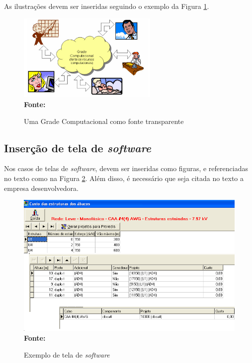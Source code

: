 As ilustrações devem ser inseridas seguindo o exemplo da Figura \ref{fig:figura1}. 
\begin{figure}[ht]
	\centering	
	\caption[\hspace{0.1cm}Grade Computacional.]{Uma Grade Computacional como fonte transparente}
	\vspace{-0.4cm}
	\includegraphics[width=0.6\textwidth]{figuras/grade-comp.png}
	 \vspace{-0.2cm}
	\\\textbf{\footnotesize Fonte: \cite{cap-livro} }
	\label{fig:figura1}
\end{figure}
\vspace{-0.5cm}

\subsection{\esp Inserção de tela de \textit{software}}

Nos casos de telas de \textit{\textit{software}}, devem ser inseridas como figuras, e referenciadas no texto
como na Figura \ref{fig:tela1}. Além disso, é necessário que seja citada no texto a empresa desenvolvedora.

\begin{figure}[!ht]
	\centering	
	\caption[\hspace{0.1cm}Exemplo de tela de \textit{software}.]{Exemplo de tela de \textit{software}}
	  \vspace{-0.4cm}
	\includegraphics[width=.8\textwidth]{figuras/tela1.png}
	 \vspace{-0.3cm}
	\\\textbf{\footnotesize Fonte: \cite{tela1}}
	\label{fig:tela1}
\end{figure}

